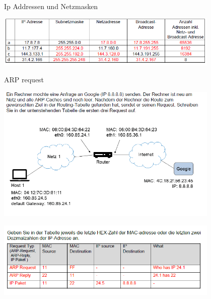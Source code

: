 \begin{example2}{Ip Addressen und Netzmasken}

  \begin{center}
  \includegraphics[width=0.8\textwidth]{images/2024-06-20-18-18-53.png}
  \end{center}

\end{example2}
\begin{example2}{ARP request}\\

  \begin{center}
  \includegraphics[width=0.8\textwidth]{images/2024-06-20-18-20-15.png}
  \end{center}

  \begin{center}
  \includegraphics[width=0.8\textwidth]{images/2024-06-20-18-20-33.png}
  \end{center}
\end{example2}
